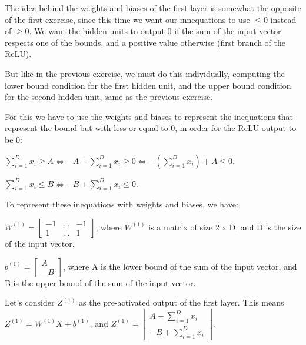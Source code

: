 \documentclass{article}
\begin{document}
The idea behind the weights and biases of the first layer is somewhat the opposite of the first exercise, since this time we want our innequations
to use $\leq 0$ instead of $\geq 0$. We want the hidden units to output 0 if the sum of the input vector respects one of the bounds, 
and a positive value otherwise (first branch of the ReLU).

But like in the previous exercise, we must do this individually, computing the lower bound condition for the first hidden unit, 
and the upper bound condition for the second hidden unit, same as the previous exercise.

\bigskip

For this we have to use the weights and biases to represent the inequations that represent the bound but with less or equal to 0, in order for
the ReLU output to be 0:

\bigskip

$ \sum_{i=1}^{D} x_i \geq A \iff -A + \sum_{i=1}^{D} x_i \geq 0 \iff -(\sum_{i=1}^{D} x_i) + A \leq 0$.

\medskip

$ \sum_{i=1}^{D} x_i \leq B \iff -B + \sum_{i=1}^{D} x_i \leq 0$.

\bigskip

To represent these inequations with weights and biases, we have:

\bigskip

\( W^{(1)} = \begin{bmatrix}
    -1 & ...  & -1\\
    1 & ... & 1
\end{bmatrix}
\), where \(W^{(1)}\) is a matrix of size 2 x D, and D is the size of the input vector.

\bigskip

\(b^{(1)} = \begin{bmatrix}
    A\\
    -B
\end{bmatrix}
\), where A is the lower bound of the sum of the input vector, and B is the upper bound of the sum of the input vector.

\bigskip

Let's consider $Z^{(1)}$ as the pre-activated output of the first layer. This means $Z^{(1)} = W^{(1)}X + b^{(1)}$, and
$Z^{(1)} = \begin{bmatrix}
    A -\sum_{i=1}^{D} x_i\\
    -B + \sum_{i=1}^{D} x_i
\end{bmatrix}
$.
\end{document}
